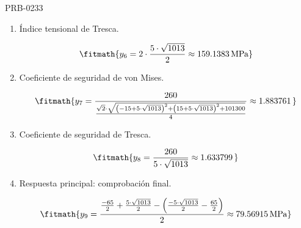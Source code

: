 \begin{studiumworked}{PRB-0233}
\begin{enumerate}
\item Índice tensional de Tresca.

\[\fitmath{y_{6}=2\cdot \frac{5\cdot \sqrt{1013}}{2}\approx 159.1383\,\mathrm{MPa}}\]

\item Coeficiente de seguridad de von Mises.

\[\fitmath{y_{7}=\frac{260}{\frac{\sqrt{2}\cdot \sqrt{{\left(-15+5\cdot \sqrt{1013}\right)}^{2}+{\left(15+5\cdot \sqrt{1013}\right)}^{2}+101300}}{4}}\approx 1.883761\,}\]

\item Coeficiente de seguridad de Tresca.

\[\fitmath{y_{8}=\frac{260}{5\cdot \sqrt{1013}}\approx 1.633799\,}\]

\item Respuesta principal: comprobación final.

\[\fitmath{y_{9}=\frac{\frac{-65}{2}+\frac{5\cdot \sqrt{1013}}{2}-\left(\frac{-5\cdot \sqrt{1013}}{2}-\frac{65}{2}\right)}{2}\approx 79.56915\,\mathrm{MPa}}\]

\end{enumerate}


\end{studiumworked}
